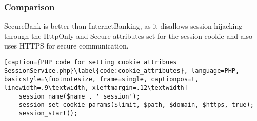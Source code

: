 \subsubsection{Comparison}
SecureBank is better than InternetBanking, as it disallows session hijacking through the HttpOnly and Secure attributes set for the session cookie and also uses HTTPS for secure communication.

\begin{lstlisting}[caption={PHP code for setting cookie attribues SessionService.php}\label{code:cookie_attributes}, language=PHP, basicstyle=\footnotesize, frame=single, captionpos=t, linewidth=.9\textwidth, xleftmargin=.12\textwidth]
    session_name($name . '_session');
    session_set_cookie_params($limit, $path, $domain, $https, true);
    session_start();
\end{lstlisting}
\clearpage
